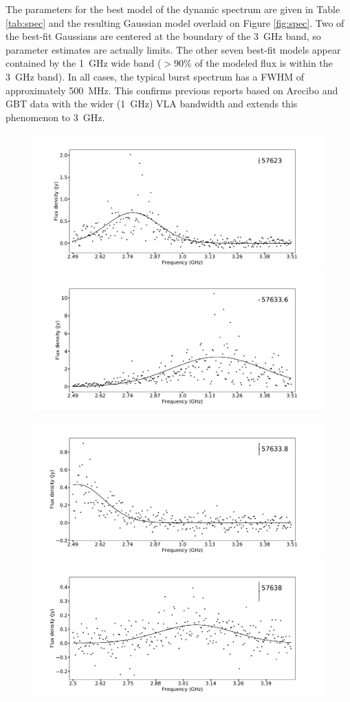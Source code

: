 \documentclass[twocolumn]{aastex61}
\begin{document}
The parameters for the best model of the dynamic spectrum are given in Table \ref{tab:spec} and the resulting Gaussian model overlaid on Figure \ref{fig:spec}.  Two of the best-fit Gaussians are centered at the boundary of the 3~GHz band, so parameter estimates are actually limits. The other seven best-fit models appear contained by the 1~GHz wide band ($>90$\% of the modeled flux is within the 3~GHz band). In all cases, the typical burst spectrum has a FWHM of approximately 500~MHz. This confirms previous reports based on Arecibo and GBT data \citep{2016Natur.531..202S, 2016arXiv160308880S} with the wider (1~GHz) VLA bandwidth and extends this phenomenon to 3~GHz.

\begin{figure}[ht]
\begin{center}
 \begin{minipage}{2\columnwidth}
  \includegraphics[width=0.5\columnwidth]{spec_57623.pdf}
  \includegraphics[width=0.5\columnwidth]{spec_57633.6.pdf}
 \end{minipage}

 \begin{minipage}{2\columnwidth}
  \includegraphics[width=0.5\columnwidth]{spec_57633.8.pdf}
  \includegraphics[width=0.5\columnwidth]{spec_57638.pdf}
 \end{minipage}


\end{center}
\end{figure}
\end{document}
